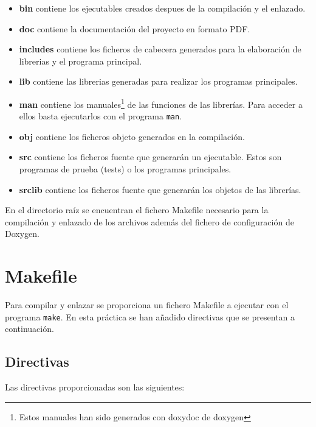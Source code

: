 \documentclass{mathnotes}
\begin{document}
\begin{itemize}
\item \textbf{bin} contiene los ejecutables creados despues de la compilación y el enlazado.

\item \textbf{doc} contiene la documentación del proyecto en formato PDF.

\item \textbf{includes} contiene los ficheros de cabecera generados para la elaboración de librerias y el programa principal.

\item \textbf{lib} contiene las librerias generadas para realizar los programas principales.

\item \textbf{man} contiene los manuales\footnote{Estos manuales han sido generados con doxydoc de doxygen} de las funciones de las librerías. Para acceder a ellos basta ejecutarlos con el programa \texttt{man}.

\item \textbf{obj} contiene los ficheros objeto generados en la compilación.

\item \textbf{src} contiene los ficheros fuente que generarán un ejecutable. Estos son programas de prueba (tests) o los programas principales.

\item \textbf{srclib} contiene los ficheros fuente que generarán los objetos de las librerías.
\end{itemize}

En el directorio raíz se encuentran el fichero Makefile necesario para la compilación y enlazado de los archivos además del fichero de configuración de Doxygen.

\section{Makefile}
Para compilar y enlazar se proporciona un fichero Makefile a ejecutar con el programa \texttt{make}. En esta práctica se han añadido directivas que se presentan a continuación.

\subsection{Directivas}
Las directivas proporcionadas son las siguientes:
\end{document}

